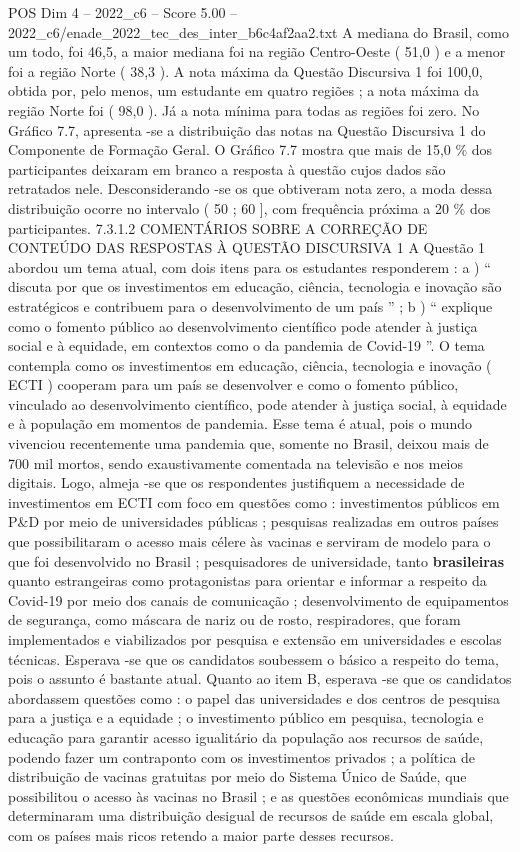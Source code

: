 \begin{textsample}{POS Dim 4 – 2022\_c6 – Score 5.00 – 2022\_c6/enade\_2022\_tec\_des\_inter\_b6c4af2aa2.txt}
A mediana do Brasil, como um todo, foi 46,5, a maior mediana foi na região Centro-Oeste ( 51,0 ) e a menor foi a região Norte ( 38,3 ).
A nota máxima da Questão Discursiva 1 foi 100,0, obtida por, pelo menos, um estudante em quatro regiões ; a nota máxima da região Norte foi ( 98,0 ).
Já a nota mínima para todas as regiões foi zero.
No Gráfico 7.7, apresenta -se a distribuição das notas na Questão Discursiva 1 do Componente de Formação Geral.
O Gráfico 7.7 mostra que mais de 15,0 \% dos participantes deixaram em branco a resposta à questão cujos dados são retratados nele.
Desconsiderando -se os que obtiveram nota zero, a moda dessa distribuição ocorre no intervalo ( 50 ; 60 ], com frequência próxima a 20 \% dos participantes. 7.3.1.2 COMENTÁRIOS SOBRE A CORREÇÃO DE CONTEÚDO DAS RESPOSTAS À QUESTÃO DISCURSIVA 1 A Questão 1 abordou um tema atual, com dois itens para os estudantes responderem : a ) “ discuta por que os investimentos em educação, ciência, tecnologia e inovação são estratégicos e contribuem para o desenvolvimento de um país ” ; b ) “ explique como o fomento público ao desenvolvimento científico pode atender à justiça social e à equidade, em contextos como o da pandemia de Covid-19 ”.
O tema contempla como os investimentos em educação, ciência, tecnologia e inovação ( ECTI ) cooperam para um país se desenvolver e como o fomento público, vinculado ao desenvolvimento científico, pode atender à justiça social, à equidade e à população em momentos de pandemia.
Esse tema é atual, pois o mundo vivenciou recentemente uma pandemia que, somente no Brasil, deixou mais de 700 mil mortos, sendo exaustivamente comentada na televisão e nos meios digitais.
Logo, almeja -se que os respondentes justifiquem a necessidade de investimentos em ECTI com foco em questões como : investimentos públicos em P\&D por meio de universidades públicas ; pesquisas realizadas em outros países que possibilitaram o acesso mais célere às vacinas e serviram de modelo para o que foi desenvolvido no Brasil ; pesquisadores de universidade, tanto \textbf{brasileiras} quanto estrangeiras como protagonistas para orientar e informar a respeito da Covid-19 por meio dos canais de comunicação ; desenvolvimento de equipamentos de segurança, como máscara de nariz ou de rosto, respiradores, que foram implementados e viabilizados por pesquisa e extensão em universidades e escolas técnicas.
Esperava -se que os candidatos soubessem o básico a respeito do tema, pois o assunto é bastante atual.
Quanto ao item B, esperava -se que os candidatos abordassem questões como : o papel das universidades e dos centros de pesquisa para a justiça e a equidade ; o investimento público em pesquisa, tecnologia e educação para garantir acesso igualitário da população aos recursos de saúde, podendo fazer um contraponto com os investimentos privados ; a política de distribuição de vacinas gratuitas por meio do Sistema Único de Saúde, que possibilitou o acesso às vacinas no Brasil ; e as questões econômicas mundiais que determinaram uma distribuição desigual de recursos de saúde em escala global, com os países mais ricos retendo a maior parte desses recursos.

\end{textsample}
